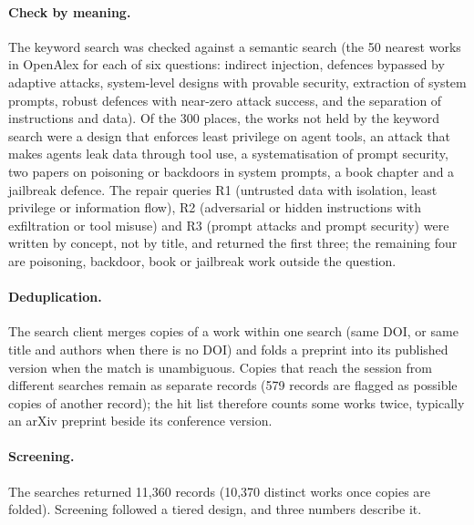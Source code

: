 \paragraph{Check by meaning.}
The keyword search was checked against a semantic search (the 50 nearest
works in OpenAlex for each of six questions: indirect injection, defences
bypassed by adaptive attacks, system-level designs with provable
security, extraction of system prompts, robust defences with near-zero
attack success, and the separation of instructions and data). Of the 300
places, the works not held by the keyword search were a design that
enforces least privilege on agent tools\autocite{Kim2025PFI}, an attack
that makes agents leak data through tool use\autocite{Fu2024Imprompter},
a systematisation of prompt security, two papers on poisoning or
backdoors in system prompts, a book chapter and a jailbreak defence.
The repair queries R1 (untrusted data with isolation, least privilege or
information flow), R2 (adversarial or hidden instructions with
exfiltration or tool misuse) and R3 (prompt attacks and prompt security)
were written by concept, not by title, and returned the first three; the
remaining four are poisoning, backdoor, book or jailbreak work outside
the question.

\paragraph{Deduplication.}
The search client merges copies of a work within one search (same DOI,
or same title and authors when there is no DOI) and folds a preprint into
its published version when the match is unambiguous. Copies that reach
the session from different searches remain as separate records (579 records are flagged as possible copies of another record);
the hit list therefore counts some works twice, typically an arXiv
preprint beside its conference version.

\paragraph{Screening.}
The searches returned 11,360 records (10,370 distinct works once copies
are folded). Screening followed a tiered design, and three numbers
describe it.

